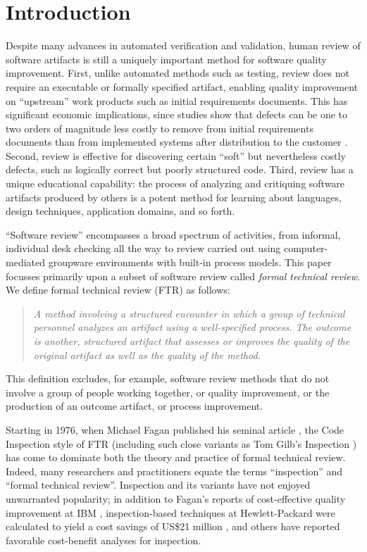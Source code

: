 \section*{Introduction}

Despite many advances in automated verification and validation, human
review of software artifacts is still a uniquely important method for
software quality improvement.  First, unlike automated methods such as
testing, review does not require an executable or formally specified
artifact, enabling quality improvement on ``upstream'' work products such
as initial requirements documents. This has significant economic
implications, since studies show that defects can be one to two orders of
magnitude less costly to remove from initial requirements documents than
from implemented systems after distribution to the customer
\cite{Boehm81}. Second, review is effective for discovering certain
``soft'' but nevertheless costly defects, such as logically correct but
poorly structured code.  Third, review has a unique educational capability:
the process of analyzing and critiquing software artifacts produced by others
is a potent method for learning about languages, design techniques,
application domains, and so forth.


``Software review'' encompasses a broad spectrum of activities, from
informal, individual desk checking all the way to review carried out using
computer-mediated groupware environments with built-in process models.
This paper focusses primarily upon a subset of software review called {\em
formal technical review}.  We define formal technical review (FTR) as
follows:

\begin{quotation}
  {\em A method involving a structured encounter in which a group of technical
  personnel analyzes an artifact using a well-specified process.
  The outcome is another, structured artifact that assesses or improves
  the quality of the original artifact as well as the quality of the method.}
\end{quotation}

This definition excludes, for example, software review methods that do 
not involve a group of people working together, or quality improvement,
or the production of an outcome artifact, or process improvement.

Starting in 1976, when Michael Fagan published his seminal article
\cite{Fagan76}, the Code Inspection style of FTR (including such close
variants as Tom Gilb's Inspection \cite{Gilb93}) has come to dominate both
the theory and practice of formal technical review.  Indeed, many
researchers and practitioners equate the terms ``inspection'' and
``formal technical review''.  Inspection and its variants have not enjoyed
unwarranted popularity; in addition to Fagan's reports of cost-effective
quality improvement at IBM \cite{Fagan86}, inspection-based
techniques at Hewlett-Packard were calculated to yield a cost savings of
US\$21 million \cite{Grady94}, and others have reported favorable
cost-benefit analyses for inspection.

